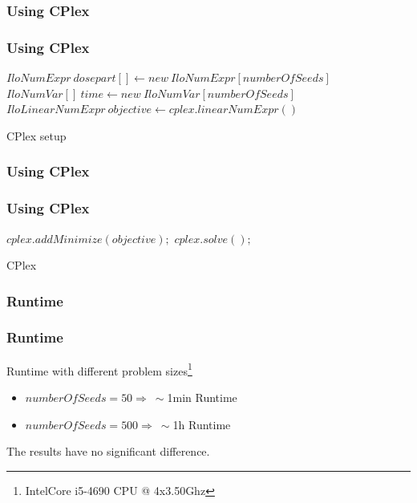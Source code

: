 \documentclass{beamer}
\begin{document}
 \subsubsection{Using CPlex}
 \begin{frame}
 \frametitle{Using CPlex}
 
 \IncMargin{1em}
 \begin{algorithm}[H]
 $IloNumExpr \ dosepart[] \gets new \ IloNumExpr[numberOfSeeds]$\;
 $IloNumVar[] \ time \gets new \ IloNumVar[numberOfSeeds]$\;
 $IloLinearNumExpr \ objective \gets cplex.linearNumExpr()$\;

 \caption{CPlex setup}
 \end{algorithm}
 \DecMargin{1em} 
 
 \end{frame}
 
 \subsubsection*{Using CPlex}
 \begin{frame}
 \frametitle{Using CPlex}
 
 \IncMargin{1em}
 \begin{algorithm}[H]
  $cplex.addMinimize(objective);$
  $cplex.solve();$
 \caption{CPlex}
 \end{algorithm}
 \DecMargin{1em} 
 
 \end{frame}
 
 \subsubsection*{Runtime}
 \begin{frame}
 \frametitle{Runtime}
 Runtime with different problem sizes\footnote{Intel\textregistered  Core i5-4690 CPU @ 4x3.50Ghz}
 
 
\begin{itemize}
\item $numberOfSeeds = 50 \Rightarrow \ \sim $1min Runtime
\item $numberOfSeeds = 500 \Rightarrow \ \sim $1h Runtime
\end{itemize}  
 
 The results have no significant difference.
 
 \end{frame}
 
 
\end{document}
